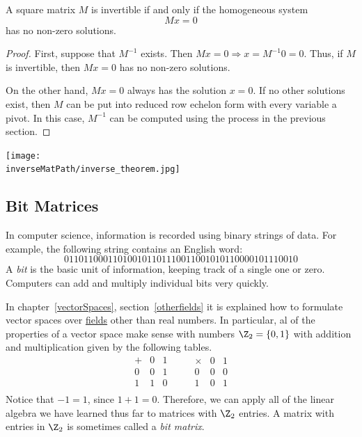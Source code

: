\begin{theorem}
A square matrix $M$ is invertible if and only if the homogeneous system $$Mx=0$$ has no non-zero solutions.
\end{theorem}

\begin{proof}
First, suppose that $M^{-1}$ exists.  Then $Mx=0 \Rightarrow x=M^{-1}0=0$.  Thus, if $M$ is invertible, then $Mx=0$ has no non-zero solutions.

On the other hand, $Mx=0$ always has the solution $x=0$.  If no other solutions exist, then $M$ can be put into reduced row echelon form with every variable a pivot.  In this case, $M^{-1}$ can be computed using the process in the previous section.
\end{proof}

\begin{center}
\texttt{[image: \\inverseMatPath/inverse\_theorem.jpg]}
\end{center}


\subsection{Bit Matrices}
In computer science, information is recorded using binary strings of data.  For example, the following string contains an English word:
\[
011011000110100101101110011001010110000101110010
\]
A \hypertarget{bits}{\emph{bit}} is the basic unit of information, keeping track of a single one or zero.  Computers can add and multiply individual bits very quickly.

In chapter~\ref{vectorSpaces}, section~\ref{otherfields} it is explained how to formulate vector spaces over \hyperref[fields]{fields} other than real numbers.
In particular, al of the properties of a 
vector space make sense with numbers $\Z_2=\{0,1 \}$ with addition and multiplication given by the following tables. 
\label{Z2}
\[
\begin{array}{c|cc}
+ & 0 & 1 \\ \hline
0 & 0 & 1 \\
1 & 1 & 0 \\
\end{array}
\qquad
\begin{array}{c|cc}
\times& 0 & 1 \\ \hline
0 & 0 & 0 \\
1 & 0 & 1 \\
\end{array}
\]
Notice that $-1=1$, since $1+1=0$.
Therefore,  we can apply all of the linear algebra we have learned thus far to matrices with $\Z_2$ entries.  A matrix with entries in $\Z_2$ is sometimes called a \emph{bit matrix}.


